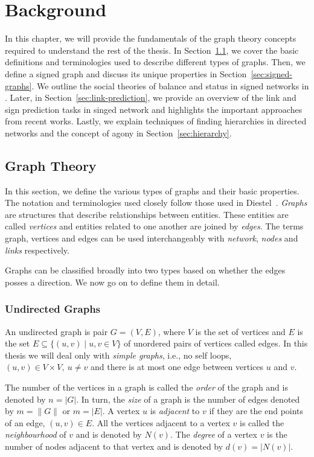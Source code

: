 
\chapter{Background}
\label{chp:background}

In this chapter, we will provide the fundamentals of the graph theory concepts required to understand the rest of the thesis.
In Section~\ref{sec:prelim}, we cover the basic definitions and terminologies used to describe different types of graphs.
Then, we define a signed graph and discuss its unique properties in Section~\ref{sec:signed-graphs}.
We outline the social theories of balance and status in signed networks in .
Later, in Section~\ref{sec:link-prediction}, we provide an overview of the link and sign prediction tasks in singed network and highlights the important approaches from recent works.
Lastly, we explain techniques of finding hierarchies in directed networks and the concept of agony in Section~\ref{sec:hierarchy}.

\section{Graph Theory}
\label{sec:prelim}
In this section, we define the various types of graphs and their basic properties.
The notation and terminologies used closely follow those used in Diestel~\cite{diestel1997graph}.
\textit{Graphs} are structures that describe relationships between entities.
These entities are called \textit{vertices} and entities related to one another are joined by \textit{edges}.
The terms graph, vertices and edges can be used interchangeably with \textit{network}, \textit{nodes} and \textit{links} respectively.

Graphs can be classified broadly into two types based on whether the edges posses a direction.
We now go on to define them in detail.
\subsection{Undirected Graphs}
An undirected graph is pair $G=(V,E)$, where $V$ is the set of vertices and $E$ is the set $E \subseteq \{ (u,v) \mid u,v \in V\}$ of unordered pairs of vertices called edges.
In this thesis we will deal only with \textit{simple graphs}, i.e., no self loops, $(u,v)\in V \times V, ~ u\neq v$ and there is at most one edge between vertices $u$ and $v$. 

The number of the vertices in a graph is called the \textit{order} of the graph and is denoted by $n= |G|$.
In turn, the \textit{size} of a graph is the number of edges denoted by $m = \|G\|$ or $m=|E|$.
A vertex $u$ is \textit{adjacent} to $v$ if they are the end points of an edge, $(u,v) \in E$.
All the vertices adjacent to a vertex $v$ is called the \textit{neighbourhood} of $v$ and is denoted by $N(v)$.
The \textit{degree} of a vertex $v$ is the number of nodes adjacent to that vertex and is denoted by $d(v) = |N(v)|$. 

